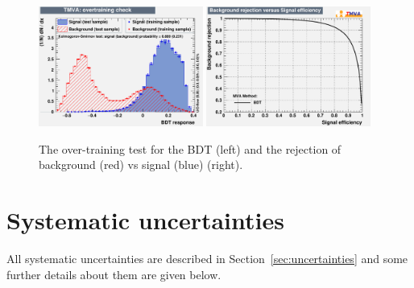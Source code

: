 \begin{figure}
    \includegraphics[width=0.48\textwidth]{images/Run2/overtrain_BDT.pdf}
    \includegraphics[width=0.48\textwidth]{images/Run2/rejBvsS.pdf}
    \caption{The over-training test for the BDT (left) and the rejection of background \ttbar (red) vs signal \tttt (blue) (right).}
    \label{fig:ROC}
\end{figure}

\section{Systematic uncertainties}
\label{sec:uncertainties13}
All systematic uncertainties are described in Section~\ref{sec:uncertainties} and some further details about them are given below.

